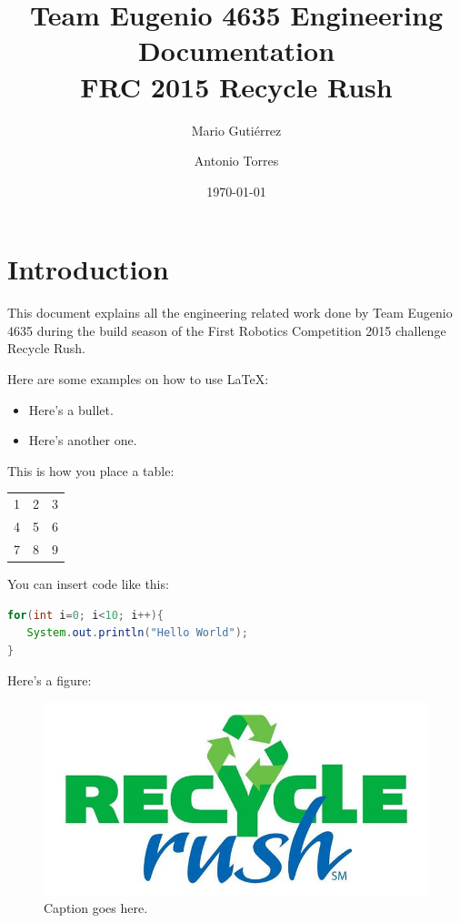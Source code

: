 \documentclass[%
 reprint, %
 amsmath,amssymb,
 aps,
 pra,
]{revtex4-1}
\begin{document}
\title{Team Eugenio 4635 Engineering Documentation \\ FRC 2015 Recycle Rush}

\author{Mario Gutiérrez}

\author{Antonio Torres}

\date{\today}

\maketitle


\section*{Introduction}
This document explains all the engineering related work done by Team Eugenio 4635 during the build season of the First Robotics Competition 2015 challenge Recycle Rush.

Here are some examples on how to use \LaTeX :
\begin{itemize}
\item Here's a bullet.
\item Here's another one.
\end{itemize}

This is how you place a table:
\begin{tabular}{ l c r }
  1 & 2 & 3 \\
  4 & 5 & 6 \\
  7 & 8 & 9 \\
\end{tabular}

You can insert code like this:
\begin{lstlisting}[language=Java]
for(int i=0; i<10; i++){
   System.out.println("Hello World");
}
\end{lstlisting}

Here's a figure:
\begin{figure}[H]
    \includegraphics[width = \columnwidth]{RecycleRush}
    \caption{Caption goes here.} 
\end{figure}
\end{document}
